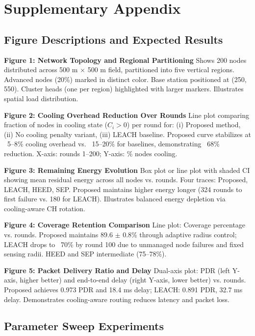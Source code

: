 \section{Supplementary Appendix}

\subsection{Figure Descriptions and Expected Results}

\textbf{Figure 1: Network Topology and Regional Partitioning}  
Shows 200 nodes distributed across 500 m $\times$ 500 m field, partitioned into five vertical regions. Advanced nodes (20\%) marked in distinct color. Base station positioned at (250, 550). Cluster heads (one per region) highlighted with larger markers. Illustrates spatial load distribution.

\textbf{Figure 2: Cooling Overhead Reduction Over Rounds}  
Line plot comparing fraction of nodes in cooling state ($C_i>0$) per round for: (i) Proposed method, (ii) No cooling penalty variant, (iii) LEACH baseline. Proposed curve stabilizes at ~5--8\% cooling overhead vs. ~15--20\% for baselines, demonstrating ~68\% reduction. X-axis: rounds 1--200; Y-axis: \% nodes cooling.

\textbf{Figure 3: Remaining Energy Evolution}  
Box plot or line plot with shaded CI showing mean residual energy across all nodes vs. rounds. Four traces: Proposed, LEACH, HEED, SEP. Proposed maintains higher energy longer (324 rounds to first failure vs. 180 for LEACH). Illustrates balanced energy depletion via cooling-aware CH rotation.

\textbf{Figure 4: Coverage Retention Comparison}  
Line plot: Coverage percentage vs. rounds. Proposed maintains 89.6 $\pm$ 0.8\% through adaptive radius control; LEACH drops to ~70\% by round 100 due to unmanaged node failures and fixed sensing radii. HEED and SEP intermediate (75--78\%).

\textbf{Figure 5: Packet Delivery Ratio and Delay}  
Dual-axis plot: PDR (left Y-axis, higher better) and end-to-end delay (right Y-axis, lower better) vs. rounds. Proposed achieves 0.973 PDR and 18.4 ms delay; LEACH: 0.891 PDR, 32.7 ms delay. Demonstrates cooling-aware routing reduces latency and packet loss.

\subsection{Parameter Sweep Experiments}

